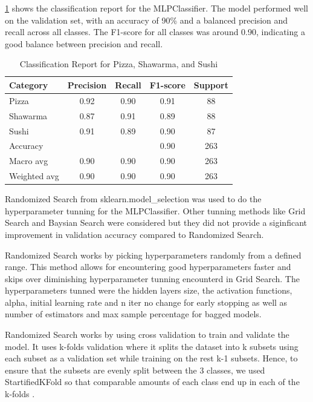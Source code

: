\ref{tab:nn_classification_report} shows the classification report for the MLPClassifier.
The model performed well on the validation set, with an accuracy of 90\% and a balanced precision and recall across all classes.
The F1-score for all classes was around 0.90, indicating a good balance between precision and recall.

\begin{table}[ht]
    \centering
    \begin{tabular}{lcccc}
        \hline
        Category     & Precision & Recall & F1-score & Support \\
        \hline
        Pizza        & 0.92      & 0.90   & 0.91     & 88      \\
        Shawarma     & 0.87      & 0.91   & 0.89     & 88      \\
        Sushi        & 0.91      & 0.89   & 0.90     & 87      \\
        \hline
        Accuracy     &           &        & 0.90     & 263     \\
        Macro avg    & 0.90      & 0.90   & 0.90     & 263     \\
        Weighted avg & 0.90      & 0.90   & 0.90     & 263     \\
        \hline
    \end{tabular}
    \caption{Classification Report for Pizza, Shawarma, and Sushi}
    \label{tab:nn_classification_report}
\end{table}


Randomized Search from sklearn.model\_selection was used to do the hyperparameter tunning for the MLPClassifier. Other tunning methods like Grid Search and
Baysian Search were considered but they did not provide a siginficant improvement in validation accuracy compared to
Randomized Search. 

Randomized Search works by picking hyperparameters randomly from a defined range. This method allows for encountering good hyperparameters faster and
skips over diminishing hyperparameter tunning encounterd in Grid Search. The hyperparameters tunned were the hidden layers size, the activation functions,
alpha, initial learning rate and n iter no change for early stopping as well as number of estimators and max sample percentage for bagged models.

Randomized Search works by using cross validation to train and validate the model. It uses k-folds validation where it splits the dataset into k subsets using
each subset as a validation set while training on the rest k-1 subsets. Hence, to ensure that the subsets are evenly split between the 3 classes,
we used StartifiedKFold so that comparable amounts of each class end up in each of the k-folds .

